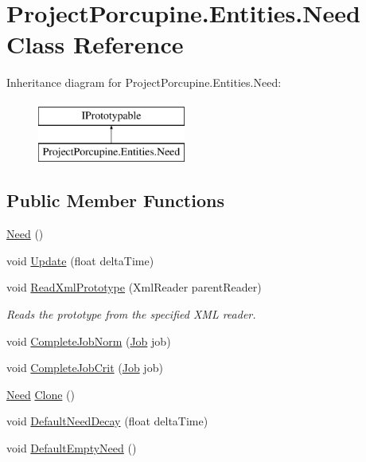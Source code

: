 \hypertarget{class_project_porcupine_1_1_entities_1_1_need}{}\section{Project\+Porcupine.\+Entities.\+Need Class Reference}
\label{class_project_porcupine_1_1_entities_1_1_need}
Inheritance diagram for Project\+Porcupine.\+Entities.\+Need\+:\begin{figure}[H]
\begin{center}
\leavevmode
\includegraphics[height=2.000000cm]{class_project_porcupine_1_1_entities_1_1_need}
\end{center}
\end{figure}
\subsection*{Public Member Functions}
\begin{DoxyCompactItemize}
\item 
\hyperlink{class_project_porcupine_1_1_entities_1_1_need_a148253883ad936962964886824a16806}{Need} ()
\item 
void \hyperlink{class_project_porcupine_1_1_entities_1_1_need_a00e0fc61e6ad375cc6f7a0d94200f481}{Update} (float delta\+Time)
\item 
void \hyperlink{class_project_porcupine_1_1_entities_1_1_need_af676e3d4ffb2be13a03ebe996dbffa18}{Read\+Xml\+Prototype} (Xml\+Reader parent\+Reader)
\begin{DoxyCompactList}\small\item\em Reads the prototype from the specified X\+ML reader. \end{DoxyCompactList}\item 
void \hyperlink{class_project_porcupine_1_1_entities_1_1_need_a04ddf2d9ecbb517d365082d33f1ced42}{Complete\+Job\+Norm} (\hyperlink{class_job}{Job} job)
\item 
void \hyperlink{class_project_porcupine_1_1_entities_1_1_need_ab2c5d9c61f2f7d11a7ceea0dca6b089b}{Complete\+Job\+Crit} (\hyperlink{class_job}{Job} job)
\item 
\hyperlink{class_project_porcupine_1_1_entities_1_1_need}{Need} \hyperlink{class_project_porcupine_1_1_entities_1_1_need_ad876e665d7a1d3b1431f4b0178ac31c1}{Clone} ()
\item 
void \hyperlink{class_project_porcupine_1_1_entities_1_1_need_a2a175d9f075fcdefa0254553cf8d178e}{Default\+Need\+Decay} (float delta\+Time)
\item 
void \hyperlink{class_project_porcupine_1_1_entities_1_1_need_ae479726245e39ddd70ccd7236839a39c}{Default\+Empty\+Need} ()
\end{DoxyCompactItemize}
